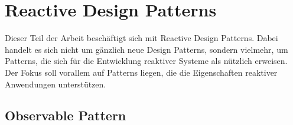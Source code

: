 \section{Reactive Design Patterns}

Dieser Teil der Arbeit beschäftigt sich mit Reactive Design Patterns. Dabei handelt es sich nicht um gänzlich neue Design Patterns, sondern vielmehr, um Patterns, die sich für die Entwicklung reaktiver Systeme als nützlich erweisen. Der Fokus soll vorallem auf Patterns liegen, die die Eigenschaften reaktiver Anwendungen unterstützen.

\subsection{Observable Pattern}


